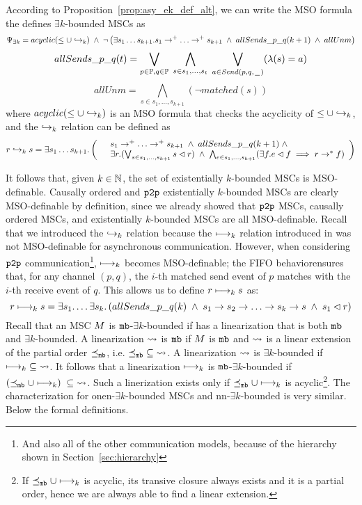 \noindent According to Proposition~\ref{prop:asy_ek_def_alt}, we can write the MSO formula the defines $\exists k$-bounded MSCs as
\[
\Psi_{\exists k}=
acyclic(\le \cup \relbAsy) \;\wedge\;
\neg \left(
	\exists s_1 \dots s_{k+1}. s_1 \procrel^+ \dots \procrel^+ s_{k+1} \;\wedge \;
	allSends\_p\_q(k+1) \;\wedge\; allUnm
\right)
\]
\[
allSends\_p\_q (t) =
\bigvee_{\substack{p \in \mathbb{P}, q \in \mathbb{P}}}\;
\bigwedge_{s \in {s_1, ..., s_{t}}}\;
\bigvee_{a \in {\mathit{Send}(p,q,\hspace{0.1em}\underline{\hspace{0.5em}}\hspace{0.1em})}}
(\lambda(s) = a)
\]
\[
allUnm = \bigwedge_{s \in {s_1, ..., s_{k+1}}}(\neg \mathit{matched}(s))
\]
where $acyclic(\le \cup \hookrightarrow_{k})$ is an MSO formula that checks the acyclicity of $\le \cup \hookrightarrow_{k}$, and the $\hookrightarrow_{k}$ relation can be defined as
\[
r \relbAsy s= \exists s_1 \dots s_{k+1}. \left(
\begin{array}{rl}
	& s_1 \procrel^+ \dots \procrel^+ s_{k+1} \;\wedge\;
	allSends\_p\_q(k+1) \;\wedge\; \\
	& \exists r. (\bigvee_{s \in {s_1, ..., s_{k+1}}}s \lhd r) \;\wedge\;
	\bigwedge_{e \in {s_1, ..., s_{k+1}}}(\exists f.e \lhd f \implies r \procrel^* f) \\
\end{array}
\right)
\]

\medskip

It follows that, given $k \in \mathbb{N}$, the set of existentially $k$-bounded MSCs is MSO-definable. Causally ordered and $\mathtt{p2p}$ existentially $k$-bounded MSCs are clearly MSO-definable by definition, since we already showed that $\mathtt{p2p}$ MSCs, causally ordered MSCs, and existentially $k$-bounded MSCs are all MSO-definable. Recall that we introduced the $\hookrightarrow_{k}$ relation because the $\longmapsto_k$ relation introduced in \cite{DBLP:conf/fossacs/LohreyM02} was not MSO-definable for asynchronous communication. However, when considering $\mathtt{p2p}$ communication\footnote{And also all of the other communication models, because of the hierarchy shown in Section~\ref{sec:hierarchy}}, $\longmapsto_k$ becomes MSO-definable; the FIFO behaviorensures that, for any channel $(p,q)$, the $i$-th matched send event of $p$ matches with the $i$-th receive event of $q$. This allows us to define $r \longmapsto_k s$ as:
\[
r \relb s=\exists s_1. \dots \exists s_k.\left(
allSends\_p\_q(k)
\;\wedge\; s_1\procrel s_2\procrel\dots
\procrel s_k\procrel s
\;\wedge\; s_1 \lhd r
\right)
\]
Recall that an MSC $M$ is $\mathtt{mb}$-$\exists k$-bounded if has a linearization that is both $\mathtt{mb}$ and $\exists k$-bounded. A linearization $\rightsquigarrow$ is $\mathtt{mb}$ if $M$ is $\mathtt{mb}$ and $\rightsquigarrow$ is a linear extension of the partial order $\preceq_{\mathtt{mb}}$, i.e. $\preceq_{\mathtt{mb}} \;\subseteq\; \rightsquigarrow$. A linearization $\rightsquigarrow$ is $\exists k$-bounded if $\longmapsto_k \;\subseteq\; \rightsquigarrow$. It follows that a linearization $\longmapsto_k$ is $\mathtt{mb}$-$\exists k$-bounded if $(\preceq_{\mathtt{mb}} \cup \longmapsto_k) \;\subseteq\; \rightsquigarrow$. Such a linerization exists only if $\preceq_{\mathtt{mb}} \cup \longmapsto_k$ is acyclic\footnote{If $\preceq_{\mathtt{mb}} \cup \longmapsto_k$ is acyclic, its transive closure always exists and it is a partial order, hence we are always able to find a linear extension.}. The characterization for onen-$\exists k$-bounded MSCs and nn-$\exists k$-bounded is very similar. Below the formal definitions.

